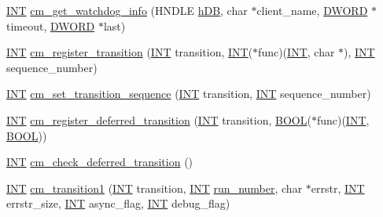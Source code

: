 \begin{DoxyCompactItemize}
\item 
\hyperlink{vppg_8h_a392e62da233ed3e2f7c3fd4f487a3896}{INT} \hyperlink{group__cmfunctionc_ga31688f905a1b4a3271dfea8b178e1108}{cm\_\-get\_\-watchdog\_\-info} (HNDLE \hyperlink{mevb_8c_ab1f60c53f74e806a3b9f687af38d7421}{hDB}, char $\ast$client\_\-name, \hyperlink{vt2_8h_a798af1e30bc65f319c1a246cecf59e39}{DWORD} $\ast$timeout, \hyperlink{vt2_8h_a798af1e30bc65f319c1a246cecf59e39}{DWORD} $\ast$last)
\item 
\hyperlink{vppg_8h_a392e62da233ed3e2f7c3fd4f487a3896}{INT} \hyperlink{group__cmfunctionc_ga00950930acadf846be75239b6d0e80dc}{cm\_\-register\_\-transition} (\hyperlink{vppg_8h_a392e62da233ed3e2f7c3fd4f487a3896}{INT} transition, \hyperlink{vppg_8h_a392e62da233ed3e2f7c3fd4f487a3896}{INT}($\ast$func)(\hyperlink{vppg_8h_a392e62da233ed3e2f7c3fd4f487a3896}{INT}, char $\ast$), \hyperlink{vppg_8h_a392e62da233ed3e2f7c3fd4f487a3896}{INT} sequence\_\-number)
\item 
\hyperlink{vppg_8h_a392e62da233ed3e2f7c3fd4f487a3896}{INT} \hyperlink{group__cmfunctionc_gac4b2b97d9cd12320b6f910f32e131aef}{cm\_\-set\_\-transition\_\-sequence} (\hyperlink{vppg_8h_a392e62da233ed3e2f7c3fd4f487a3896}{INT} transition, \hyperlink{vppg_8h_a392e62da233ed3e2f7c3fd4f487a3896}{INT} sequence\_\-number)
\item 
\hyperlink{vppg_8h_a392e62da233ed3e2f7c3fd4f487a3896}{INT} \hyperlink{group__cmfunctionc_gaa043c651932a8d63ce6104a9ad79f370}{cm\_\-register\_\-deferred\_\-transition} (\hyperlink{vppg_8h_a392e62da233ed3e2f7c3fd4f487a3896}{INT} transition, \hyperlink{vt2_8h_a239c7f0d40651c3e419c5b9651507d14}{BOOL}($\ast$func)(\hyperlink{vppg_8h_a392e62da233ed3e2f7c3fd4f487a3896}{INT}, \hyperlink{vt2_8h_a239c7f0d40651c3e419c5b9651507d14}{BOOL}))
\item 
\hyperlink{vppg_8h_a392e62da233ed3e2f7c3fd4f487a3896}{INT} \hyperlink{group__cmfunctionc_gabc9cc8ea21e435ffff94d359686897e3}{cm\_\-check\_\-deferred\_\-transition} ()
\item 
\hyperlink{vppg_8h_a392e62da233ed3e2f7c3fd4f487a3896}{INT} \hyperlink{group__cmfunctionc_ga0dd9a488ef81843f8a64c7930ad40f06}{cm\_\-transition1} (\hyperlink{vppg_8h_a392e62da233ed3e2f7c3fd4f487a3896}{INT} transition, \hyperlink{vppg_8h_a392e62da233ed3e2f7c3fd4f487a3896}{INT} \hyperlink{mevb_8c_a16695ea2bfd19f294afe066d6007ab36}{run\_\-number}, char $\ast$errstr, \hyperlink{vppg_8h_a392e62da233ed3e2f7c3fd4f487a3896}{INT} errstr\_\-size, \hyperlink{vppg_8h_a392e62da233ed3e2f7c3fd4f487a3896}{INT} async\_\-flag, \hyperlink{vppg_8h_a392e62da233ed3e2f7c3fd4f487a3896}{INT} debug\_\-flag)

\end{DoxyCompactItemize}
